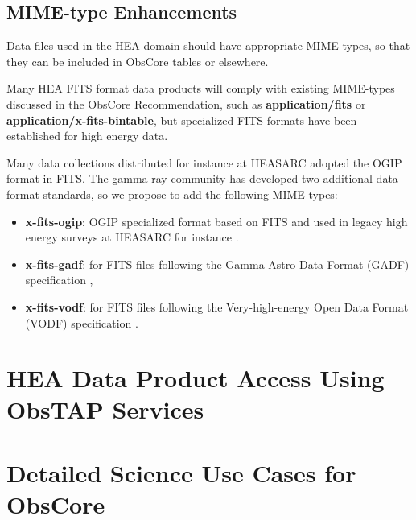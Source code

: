 \documentclass[11pt,a4paper]{ivoa}
\begin{document}
\subsection{MIME-type Enhancements}\label{sec:mimetypes}

Data files used in the \gls{HEA} domain should have appropriate MIME-types, so that they can be included in ObsCore tables or elsewhere.

Many \gls{HEA} FITS format data products will comply with existing MIME-types discussed in the ObsCore Recommendation, such as {\bf application/fits} or {\bf application/x-fits-bintable}, but specialized FITS formats have been established for high energy data.

Many data collections distributed for instance at HEASARC adopted the OGIP format in FITS\null.
The gamma-ray community has developed two additional data format standards, so we propose to add the following MIME-types:

\begin{itemize}
\item {\bf x-fits-ogip}: OGIP specialized format based on FITS and used in legacy high energy surveys at HEASARC for instance \citep{ogip_Fits_event}.
\item {\bf x-fits-gadf}: for FITS files following the Gamma-Astro-Data-Format (GADF) specification \citep{deil_2022_7304668},
\item {\bf x-fits-vodf}: for FITS files following the Very-high-energy Open Data Format (VODF) specification \citep{2023arXiv230813385K}.
\end{itemize}


\pagebreak
\section{\gls{HEA} Data Product Access Using ObsTAP Services}\label{sec:accessoptions}




\pagebreak



\appendix


\pagebreak
\section{Detailed Science Use Cases for ObsCore}
\label{sec:uc}


\end{document}
